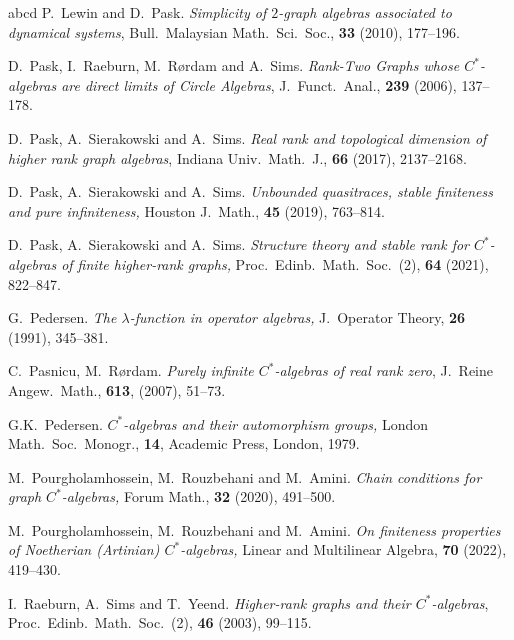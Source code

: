 \documentclass[12pt]{amsart}
\theoremstyle{plain}
\theoremstyle{definition}
\theoremstyle{remark}
\begin{document}
\begin{thebibliography}{abcd}
 P.\ Lewin and D.\ Pask. \emph{Simplicity of $2$-graph algebras associated to dynamical systems}, Bull.\ Malaysian Math.\ Sci.\ Soc., {\bf 33} (2010), 177--196. 

 D.\ Pask, I.\ Raeburn, M.\ R\o rdam and A.\ Sims. \emph{Rank-Two Graphs whose $C^*$-algebras are direct limits of
Circle Algebras}, J.\ Funct.\ Anal., {\bf 239}  (2006),
137--178. %

 D.\ Pask, A.\ Sierakowski and A.\ Sims. \emph{Real rank and topological dimension of higher rank graph algebras}, Indiana Univ.\ Math.\ J., \textbf{66} (2017), 2137--2168.

 D.\ Pask, A.\ Sierakowski and A.\ Sims. \emph{Unbounded quasitraces, stable finiteness and pure infiniteness,} Houston J.\ Math., \textbf{45} (2019), 763--814.

 D.\ Pask, A.\ Sierakowski and A.\ Sims.
\emph{Structure theory and stable rank for $C^*$-algebras of finite higher-rank graphs,}  Proc.\ Edinb.\ Math.\ Soc.\ (2), \textbf{64} (2021), 822--847.

 G.\ Pedersen. \emph{The $\lambda$-function in operator algebras,} J.\ Operator Theory, \textbf{26} (1991), 345--381.

 C.\ Pasnicu, M.\ R{\o}rdam.
\emph{Purely infinite $C^*$-algebras of real rank zero}, J.\ Reine Angew.\ Math., \textbf{613},
(2007), 51--73.

 G.K.\ Pedersen.
\emph{$C^*$-algebras and their automorphism groups,} London Math.\ Soc.\ Monogr., \textbf{14},
Academic Press, London, 1979.

 M.\ Pourgholamhossein, M.\ Rouzbehani and M.\ Amini. \emph{Chain conditions for graph $C^*$-algebras,} Forum Math., \textbf{32} (2020), 491--500.

 M.\ Pourgholamhossein, M.\ Rouzbehani and M.\ Amini. \emph{On finiteness properties of Noetherian (Artinian) $C^*$-algebras,} Linear and Multilinear Algebra, \textbf{70} (2022), 419--430.

 I.\ Raeburn, A.\ Sims and T.\ Yeend.
\emph{Higher-rank graphs and their {$C^*$}-algebras},
Proc.\ Edinb.\ Math.\ Soc.\ (2), \textbf{46} (2003), 99--115.



\end{thebibliography}
\end{document}
